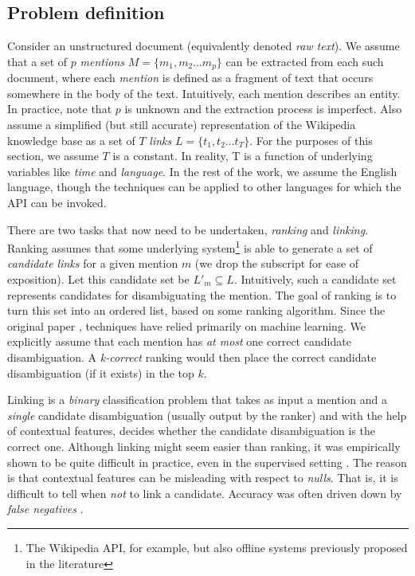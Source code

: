 \subsection{Problem definition}
Consider an unstructured document (equivalently denoted \emph{raw text}). We assume that a set of $p$ \emph{mentions} $M=\{m_1,m_2\ldots m_p\}$ can be extracted from each such document, where each \emph{mention} is defined as a fragment of text that occurs somewhere in the body of the text. Intuitively, each mention describes an entity. In practice, note that $p$ is unknown and the extraction process is imperfect. Also assume a simplified (but still accurate) representation of the Wikipedia knowledge base as a set of $T$ \emph{links} $L=\{t_1,t_2\ldots t_T\}$. For the purposes of this section, we assume $T$ is a constant. In reality, T is a function of underlying variables like \emph{time} and \emph{language}. In the rest of the work, we assume the English language, though the techniques can be applied to other languages for which the API can be invoked. 

There are two tasks that now need to be undertaken, \emph{ranking} and \emph{linking}. Ranking assumes that some underlying system\footnote{The Wikipedia API, for example, but also offline systems previously proposed in the literature} is able to generate a set of \emph{candidate links} for a given mention $m$ (we drop the subscript for ease of exposition). Let this candidate set be $L'_m \subseteq L$. Intuitively, such a candidate set represents candidates for disambiguating the mention. The goal of ranking is to turn this set into an ordered list, based on some ranking algorithm. Since the original paper \cite{bunescu}, techniques have relied primarily on machine learning. We explicitly assume that each mention has \emph{at most} one correct candidate disambiguation. A \emph{k-correct} ranking would then place the correct candidate disambiguation (if it exists) in the top $k$. 

Linking is a \emph{binary} classification problem that takes as input a mention and a \emph{single} candidate disambiguation (usually output by the ranker) and with the help of contextual features, decides whether the candidate disambiguation is the correct one. Although linking might seem easier than ranking, it was empirically shown to be quite difficult in practice, even in the supervised setting \cite{roth}. The reason is that contextual features can be misleading with respect to \emph{nulls}. That is, it is difficult to tell when \emph{not} to link a candidate. Accuracy was often driven down by \emph{false negatives} \cite{roth}.

